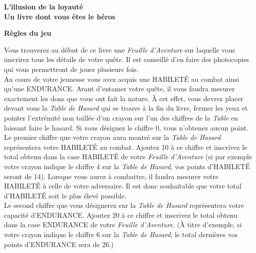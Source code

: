 \documentclass[11pt]{book}
\begin{document}
\frontmatter

\begin{titlepage}
    \begin{center}
        \textbf{\huge L'illusion de la loyauté}\\[0.5cm]
        \textbf{\large Un livre dont vous êtes le héros}\\[2cm]
    \end{center}
\end{titlepage}

\begin{center}
    \textbf{\Large{Règles du jeu}}\\
\end{center}
Vous trouverez au début de ce livre une \textit{Feuille d'Aventure} sur laquelle vous inscrirez
tous les détails de votre quête. Il est conseillé d'en faire des photocopies qui vous permettront de
jouer plusieurs fois.\\

Au cours de votre jeunesse vous avez acquis une HABILETÉ au combat ainsi qu'une ENDURANCE.
Avant d'entamer votre quête, il vous faudra mesurer exactement les dons que vous ont fait la
nature. À cet effet, vous devrez placer devant vous la \textit{Table de Hasard} qui se trouve
à la fin du livre, fermer les yeux et pointer l'extrémité non taillée d'un crayon sur l'un
des chiffres de la \textit{Table} en laissant faire le hasard. Si vous désignez le chiffre
0, vous n'obtenez aucun point.\\

Le premier chiffre que votre crayon aura montré sur la \textit{Table de
Hasard} représentera votre HABILETÉ au combat. Ajoutez 10 à ce
chiffre et inscrivez le total obtenu dans la case HABILETÉ de votre
\textit{Feuille d'Aventure} (si par exemple votre crayon indique le chiffre
4 sur la \textit{Table de Hasard}, vos points d'HABILETÉ seront de 14).
Lorsque vous aurez à combattre, il faudra mesurer votre
HABILETÉ à celle de votre adversaire. Il est donc souhaitable que
votre total d'HABILETÉ soit le plus élevé possible.\\

Le second chiffre que vous désignerez sur la \textit{Table de Hasard} représentera
votre capacité d'ENDURANCE. Ajoutez 20 à ce chiffre et inscrivez le total obtenu
dans la case ENDURANCE de votre \textit{Feuille d'Aventure}. (À titre d'exemple,
si votre crayon indique le chiffre 6 sur la \textit{Table de Hasard}, le total dernières
vos points d'ENDURANCE sera de 26.)\\
\end{document}
